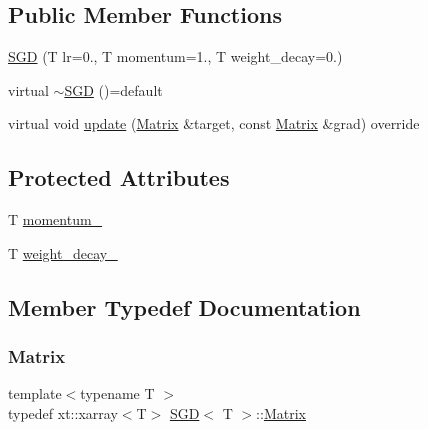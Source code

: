 \subsection*{Public Member Functions}
\begin{DoxyCompactItemize}
\item 
\mbox{\hyperlink{class_s_g_d_ab5164133117de1bdba4c735dfa535749}{S\+GD}} (T lr=0., T momentum=1., T weight\+\_\+decay=0.)
\item 
virtual \mbox{\hyperlink{class_s_g_d_a67a8d9c380b94c86158ab1709b752e1a}{$\sim$\+S\+GD}} ()=default
\item 
virtual void \mbox{\hyperlink{class_s_g_d_a0345cfa977a251c576096ea6a098230f}{update}} (\mbox{\hyperlink{class_s_g_d_a0c157dbad2dc900c00b9ca57f23ba676}{Matrix}} \&target, const \mbox{\hyperlink{class_s_g_d_a0c157dbad2dc900c00b9ca57f23ba676}{Matrix}} \&grad) override
\end{DoxyCompactItemize}
\subsection*{Protected Attributes}
\begin{DoxyCompactItemize}
\item 
T \mbox{\hyperlink{class_s_g_d_abc4dc58d224e921bc278508f5edfe1bd}{momentum\+\_\+}}
\item 
T \mbox{\hyperlink{class_s_g_d_ae34e45e15ff22ca62ee0d61104da2ff7}{weight\+\_\+decay\+\_\+}}
\end{DoxyCompactItemize}


\subsection{Member Typedef Documentation}
\mbox{\label{class_s_g_d_a0c157dbad2dc900c00b9ca57f23ba676}} 
\subsubsection{\texorpdfstring{Matrix}{Matrix}}
{\footnotesize\ttfamily template$<$typename T $>$ \\
typedef xt\+::xarray$<$T$>$ \mbox{\hyperlink{class_s_g_d}{S\+GD}}$<$ T $>$\+::\mbox{\hyperlink{class_s_g_d_a0c157dbad2dc900c00b9ca57f23ba676}{Matrix}}}

\mbox{\label{class_s_g_d_a3275687cc77c8557e2198c1feaed28a4}} 
